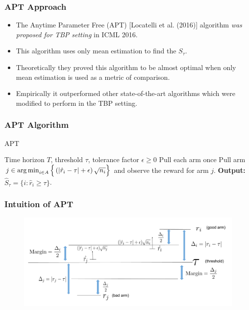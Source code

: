 \begin{frame}
\frametitle{APT Approach}
\begin{itemize}
\item<1-> The Anytime Parameter Free (APT) [{Locatelli et al. (2016)}] algorithm \textit{was proposed for TBP setting} in ICML 2016. 
\item<2-> This algorithm uses only mean estimation to find the $S_{\tau}$. 
\item<3-> Theoretically they proved this algorithm to be almost optimal when only mean estimation is used as a metric of comparison.
\item<4-> Empirically it outperformed other state-of-the-art algorithms which were modified to perform in the TBP setting.  
\end{itemize}
\end{frame}

\begin{frame}
\frametitle{APT Algorithm}
\begin{algorithm}[H]
\caption{APT}
\begin{algorithmic}
 Time horizon $T$, threshold $\tau$, tolerance factor $\epsilon\geq 0$
\State Pull each arm once
\vspace{-3mm}
\State {}
\State Pull arm $j\in\operatorname*{arg\,min}_{i\in A}\Big\lbrace \left(|\hat{r}_{i} - \tau | + \epsilon\right)\sqrt{n_i}\Big\rbrace$ and observe the reward for arm $j$.
\EndFor
\State \textbf{Output:} $\hat{S}_{\tau}=\lbrace i: \hat{r}_{i}\geq \tau \rbrace$.
\end{algorithmic}
\end{algorithm}
\end{frame}


\begin{frame}
\frametitle{Intuition of APT}
\begin{figure}
\includegraphics[scale=0.278]{img/APT_intuition.png}
\end{figure}
\end{frame}





